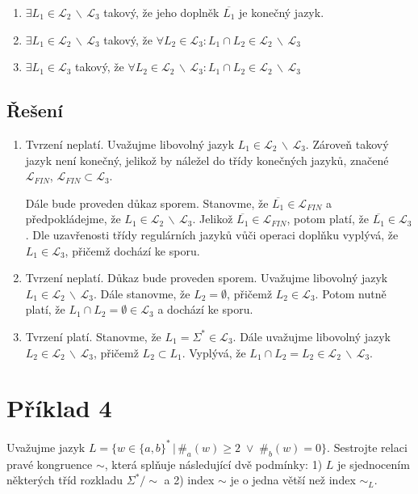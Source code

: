 \documentclass[a4paper, 12pt]{article}
\theoremstyle{definition}
\theoremstyle{definition}
\theoremstyle{definition}
\theoremstyle{remark}
\begin{document}
\begin{enumerate}[label=(\alph*)]
    \item $\exists L_1 \in \mathcal{L}_2 \, \backslash \, \mathcal{L}_3$ takový, že jeho doplněk $\overline{L_1}$ je konečný jazyk.
    \item $\exists L_1 \in \mathcal{L}_2 \, \backslash \, \mathcal{L}_3$ takový, že $\forall L_2 \in \mathcal{L}_3: L_1 \cap L_2 \in \mathcal{L}_2 \, \backslash \, \mathcal{L}_3$
    \item $\exists L_1 \in \mathcal{L}_3$ takový, že $\forall L_2 \in \mathcal{L}_2 \, \backslash \, \mathcal{L}_3: L_1 \cap L_2 \in \mathcal{L}_2 \, \backslash \, \mathcal{L}_3$
\end{enumerate}

\subsection{Řešení}

\begin{enumerate}[label=(\alph*)]
    \item Tvrzení neplatí. Uvažujme libovolný jazyk $L_1 \in \mathcal{L}_2 \, \backslash \, \mathcal{L}_3$. Zároveň takový jazyk není konečný, jelikož by náležel do třídy konečných jazyků, značené $\mathcal{L}_{FIN}$, $\mathcal{L}_{FIN} \subset \mathcal{L}_3$.
    
    Dále bude proveden důkaz sporem. Stanovme, že $\overline{L_1} \in \mathcal{L}_{FIN}$ a předpokládejme, že $L_1 \in \mathcal{L}_2 \, \backslash \, \mathcal{L}_3$. Jelikož $\overline{L_1} \in \mathcal{L}_{FIN}$, potom platí, že $\overline{L_1} \in \mathcal{L}_3$. Dle uzavřenosti třídy regulárních jazyků vůči operaci doplňku vyplývá, že $L_1 \in \mathcal{L}_3$, přičemž dochází ke sporu.

    \item Tvrzení neplatí. Důkaz bude proveden sporem. Uvažujme libovolný jazyk $L_1 \in \mathcal{L}_2 \, \backslash \, \mathcal{L}_3$. Dále stanovme, že $L_2 = \emptyset$, přičemž $L_2 \in \mathcal{L}_3$. Potom nutně platí, že $L_1 \cap L_2 = \emptyset \in \mathcal{L}_3$ a dochází ke sporu.
    \item Tvrzení platí. Stanovme, že $L_1 = \Sigma^\ast \in \mathcal{L}_3$. Dále uvažujme libovolný jazyk $L_2 \in \mathcal{L}_2 \, \backslash \, \mathcal{L}_3$, přičemž $L_2 \subset L_1$. Vyplývá, že $L_1 \cap L_2 = L_2 \in \mathcal{L}_2 \, \backslash \, \mathcal{L}_3$.
\end{enumerate}

\section{Příklad 4}
Uvažujme jazyk $L = \{w \in \{a,b\}^\ast \, | \, \#_a(w) \geq 2 \; \lor \; \#_b(w) = 0\}$. Sestrojte relaci pravé kongruence $\sim$, která splňuje následující dvě podmínky: 1) $L$ je sjednocením některých tříd rozkladu $\Sigma^\ast / \sim$ a 2) index $\sim$ je o jedna větší než index $\sim_L$.
\end{document}
